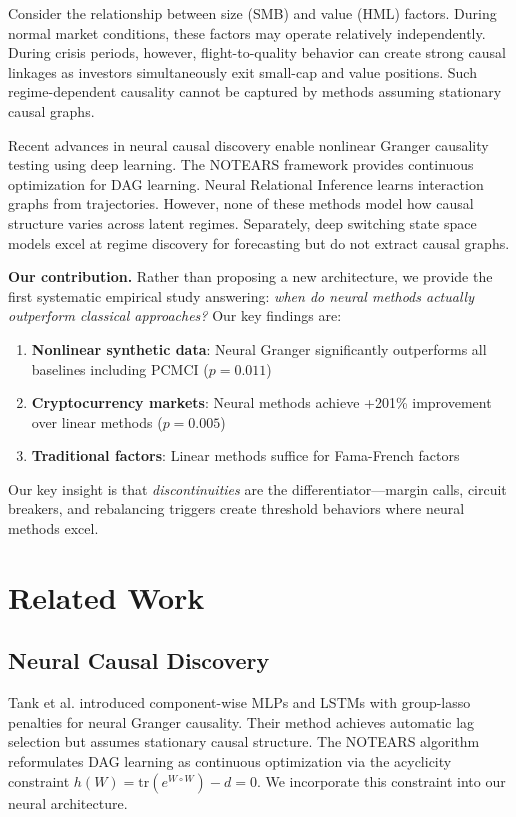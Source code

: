 \documentclass[sigconf,nonacm]{acmart}
\begin{document}
Consider the relationship between size (SMB) and value (HML) factors. During normal market conditions, these factors may operate relatively independently. During crisis periods, however, flight-to-quality behavior can create strong causal linkages as investors simultaneously exit small-cap and value positions. Such regime-dependent causality cannot be captured by methods assuming stationary causal graphs.

Recent advances in neural causal discovery \cite{tank2021neural} enable nonlinear Granger causality testing using deep learning. The NOTEARS framework \cite{zheng2018dags} provides continuous optimization for DAG learning. Neural Relational Inference \cite{kipf2018neural} learns interaction graphs from trajectories. However, none of these methods model how causal structure varies across latent regimes. Separately, deep switching state space models \cite{xu2021deep} excel at regime discovery for forecasting but do not extract causal graphs.

\textbf{Our contribution.} Rather than proposing a new architecture, we provide the first systematic empirical study answering: \textit{when do neural methods actually outperform classical approaches?} Our key findings are:
\begin{enumerate}
    \item \textbf{Nonlinear synthetic data}: Neural Granger significantly outperforms all baselines including PCMCI ($p=0.011$)
    \item \textbf{Cryptocurrency markets}: Neural methods achieve +201\% improvement over linear methods ($p=0.005$)
    \item \textbf{Traditional factors}: Linear methods suffice for Fama-French factors
\end{enumerate}

Our key insight is that \textit{discontinuities} are the differentiator---margin calls, circuit breakers, and rebalancing triggers create threshold behaviors where neural methods excel.

\section{Related Work}

\subsection{Neural Causal Discovery}
Tank et al. \cite{tank2021neural} introduced component-wise MLPs and LSTMs with group-lasso penalties for neural Granger causality. Their method achieves automatic lag selection but assumes stationary causal structure. The NOTEARS algorithm \cite{zheng2018dags} reformulates DAG learning as continuous optimization via the acyclicity constraint $h(W) = \text{tr}(e^{W \circ W}) - d = 0$. We incorporate this constraint into our neural architecture.
\end{document}
